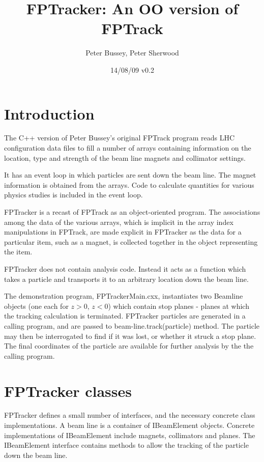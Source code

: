 \documentclass[a4paper,12pt]{article}
\begin{document}

\title{FPTracker: An OO version of FPTrack}
\author{Peter Bussey, Peter Sherwood}
\date{14/08/09 v0.2}
\maketitle

\section{Introduction}
The C++ version of Peter Bussey's original FPTrack program reads LHC
configuration data files to fill a number of arrays containing information
on the location, type and strength of the beam line magnets and collimator settings.

It has an event loop in which particles are sent down the beam line. The magnet
information is obtained from the arrays. Code to calculate quantities for
various physics studies is included in the event loop.

FPTracker is a recast of FPTrack as an object-oriented program. The
associations among the data of the various arrays, which is implicit in
the array index manipulations in FPTrack, are made explicit in FPTracker
as the data for a particular item, such as a magnet, is collected together
in the object representing the item.

FPTracker does not contain analysis code. Instead it acts as a function which
takes a particle and transports it to an arbitrary location down the beam line.

The demonstration program, FPTrackerMain.cxx, instantiates two Beamline objects
(one each for $z>0$, $z<0$) which contain stop planes - planes at
which the tracking calculation is terminated. FPTracker particles are generated in
a calling program, and are passed to beam-line.track(particle) method. The particle
may then be interrogated to find if it was lost, or whether it struck a stop plane.
The final coordinates of the particle are available for further analysis by the
the calling program.

\section{FPTracker classes}
FPTracker defines a small number of interfaces, and the necessary concrete
class implementations. A beam line is a container of IBeamElement objects.
Concrete implementations of IBeamElement include magnets, collimators and
planes. The IBeamElement interface contains methods to allow the tracking
of the particle down the beam line.
\end{document}
